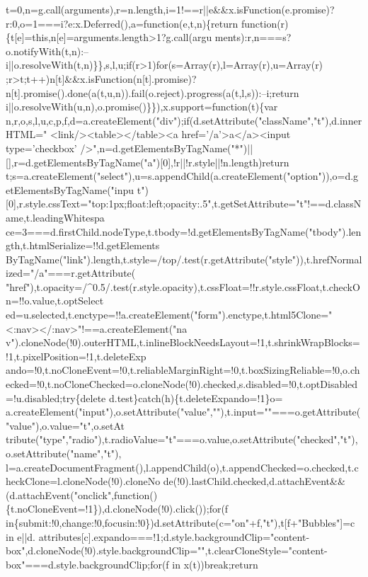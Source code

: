 \begin{DoxyCode}
{       t=0,n=g.call(arguments),r=n.length,i=1!==r||e&&x.isFunction(e.promise)?r:0,o=1===i?e:x.Deferred(),a=function(e,t,n)\{return
       function(r)\{t[e]=this,n[e]=arguments.length>1?g.call(argu
      ments):r,n===s?o.notifyWith(t,n):--i||o.resolveWith(t,n)\}\},s,l,u;if(r>1)for(s=Array(r),l=Array(r),u=Array(r)
      ;r>t;t++)n[t]&&x.isFunction(n[t].promise)?n[t].promise().done(a(t,u,n)).fail(o.reject).progress(a(t,l,s)):--i;return i||o.resolveWith(u,n),o.promise()\}\}),x.support=function(t)\{var
       n,r,o,s,l,u,c,p,f,d=a.createElement("div");if(d.setAttribute("className","t"),d.innerHTML="  <link/><table></table><a href='}/a\textcolor{stringliteral}{'>a</a><input
       type='}checkbox\textcolor{stringliteral}{'
      />",n=d.getElementsByTagName("*")||[],r=d.getElementsByTagName("a")[0],!r||!r.style||!n.length)return
       t;s=a.createElement("select"),u=s.appendChild(a.createElement("option")),o=d.getElementsByTagName("inpu
      t")[0],r.style.cssText="top:1px;float:left;opacity:.5",t.getSetAttribute="t"!==d.className,t.leadingWhitespa
      ce=3===d.firstChild.nodeType,t.tbody=!d.getElementsByTagName("tbody").length,t.htmlSerialize=!!d.getElements
      ByTagName("link").length,t.style=/top/.test(r.getAttribute("style")),t.hrefNormalized="/a"===r.getAttribute(
      "href"),t.opacity=/^0.5/.test(r.style.opacity),t.cssFloat=!!r.style.cssFloat,t.checkOn=!!o.value,t.optSelect
      ed=u.selected,t.enctype=!!a.createElement("form").enctype,t.html5Clone="<:nav></:nav>"!==a.createElement("na
      v").cloneNode(!0).outerHTML,t.inlineBlockNeedsLayout=!1,t.shrinkWrapBlocks=!1,t.pixelPosition=!1,t.deleteExp
      ando=!0,t.noCloneEvent=!0,t.reliableMarginRight=!0,t.boxSizingReliable=!0,o.checked=!0,t.noCloneChecked=o.cloneNode(!0).checked,s.disabled=!0,t.optDisabled=!u.disabled;try\{delete
       d.test\}catch(h)\{t.deleteExpando=!1\}o=
      a.createElement("input"),o.setAttribute("value",""),t.input=""===o.getAttribute("value"),o.value="t",o.setAt
      tribute("type","radio"),t.radioValue="t"===o.value,o.setAttribute("checked","t"),o.setAttribute("name","t"),
      l=a.createDocumentFragment(),l.appendChild(o),t.appendChecked=o.checked,t.checkClone=l.cloneNode(!0).cloneNo
      de(!0).lastChild.checked,d.attachEvent&&(d.attachEvent("onclick",function()\{t.noCloneEvent=!1\}),d.cloneNode(!0).click());for(f in\{submit:!0,change:!0,focusin:!0\})d.setAttribute(c="on"+f,"t"),t[f+"Bubbles"]=c in
       e||d.
      attributes[c].expando===!1;d.style.backgroundClip="content-box",d.cloneNode(!0).style.backgroundClip="",t.clearCloneStyle="content-box"===d.style.backgroundClip;for(f in x(t))break;return
}
\end{DoxyCode}
